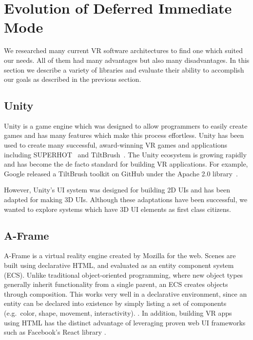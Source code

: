 \documentclass[conference,12pt]{IEEEtran}
\begin{document}
\section{Evolution of Deferred Immediate Mode}\label{sec:evolution}
We researched many current VR software architectures to find one which suited
our needs. All of them had many advantages but also many disadvantages. In this
section we describe a variety of libraries and evaluate their ability to
accomplish our goals as described in the previous section.

\subsection{Unity}\label{sec:unity}
Unity is a game engine which was designed to allow programmers to easily create
games and has many features which make this process effortless. Unity has been
used to create many successful, award-winning VR games and applications
including SUPERHOT~\cite{UploadVR:SUPERHOT} and
TiltBrush~\cite{Unity:TiltBrush}. The Unity ecosystem is growing rapidly and has
become the de facto standard for building VR applications. For example, Google
released a TiltBrush toolkit on GitHub under the Apache 2.0
library~\cite{Google:TiltBrush}.

However, Unity's UI system was designed for building 2D UIs and has been adapted
for making 3D UIs. Although these adaptations have been successful, we wanted to
explore systems which have 3D UI elements as first class citizens.

\subsection{A-Frame}\label{sec:aframe}

A-Frame is a virtual reality engine created by Mozilla for the web. Scenes are
built using declarative HTML, and evaluated as an entity component system (ECS).
Unlike traditional object-oriented programming, where new object types generally
inherit functionality from a single parent, an ECS creates objects through
composition. This works very well in a declarative environment, since an entity
can be declared into existence by simply listing a set of components (e.g.\
color, shape, movement, interactivity).
\cite{Mozilla-Hacks:2016:Building-A-Frame}. In addition, building VR apps using
HTML has the distinct advantage of leveraging proven web UI frameworks such as
Facebook's React library \cite{Ngo:2017:AFrame:React}.
\end{document}
